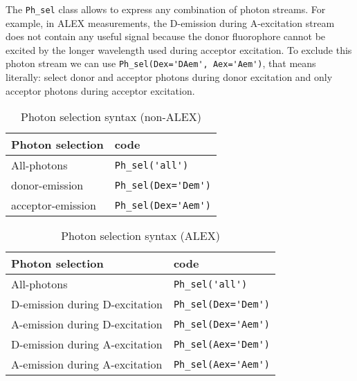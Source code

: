 The \verb|Ph_sel| class allows to express any combination of photon streams. For example, in ALEX measurements, the D-emission during A-excitation stream does not contain any useful signal because the donor fluorophore cannot be excited by the longer wavelength used during acceptor excitation. To exclude this photon stream we can use \verb|Ph_sel(Dex='DAem', Aex='Aem')|, that means literally: select donor and acceptor photons during donor excitation and only acceptor photons during acceptor excitation.


\begin{table}
\centering
\begin{tabular}{l|l}
  Photon selection  & code \\
  \hline
  All-photons       & \verb|Ph_sel('all')|\\
  donor-emission    & \verb|Ph_sel(Dex='Dem')|\\
  acceptor-emission & \verb|Ph_sel(Dex='Aem')|\\
\end{tabular}
\caption{\label{tab:ph_sel_smfret}Photon selection syntax (non-ALEX)}
\end{table}

\begin{table}
\centering
\begin{tabular}{l|l}
  Photon selection  & code \\
  \hline
  All-photons & \verb|Ph_sel('all')|\\
  D-emission during D-excitation & \verb|Ph_sel(Dex='Dem')|\\
  A-emission during D-excitation & \verb|Ph_sel(Dex='Aem')|\\
  D-emission during A-excitation & \verb|Ph_sel(Aex='Dem')|\\
  A-emission during A-excitation & \verb|Ph_sel(Aex='Aem')|\\
\end{tabular}
\caption{\label{tab:ph_sel_alex}Photon selection syntax (ALEX)}
\end{table}
